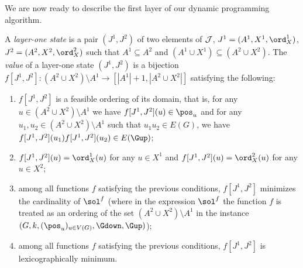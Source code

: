 We are now ready to describe the first layer of our dynamic programming algorithm.
\begin{definition}
A \emph{layer-one state} is a pair $(J^1,J^2)$ of two elements of $\mathcal{J}$,
$J^1 = (A^1,X^1,\ord_X^1)$, $J^2 = (A^2,X^2,\ord_X^2)$ such that 
$A^1 \subseteq A^2$ and $(A^1 \cup X^1) \subseteq (A^2 \cup X^2)$.
The \emph{value} of a layer-one state $(J^1,J^2)$ is a bijection
$f[J^1,J^2] : (A^2 \cup X^2) \setminus A^1 \to [|A^1|+1,|A^2\cup X^2|]$ satisfying the following:
\begin{enumerate}
\item $f[J^1,J^2]$ is a feasible ordering of its domain, that is,
  for any $u \in (A^2 \cup X^2) \setminus A^1$ we have $f[J^1,J^2](u) \in \pos_u$ and
  for any $u_1,u_2 \in (A^2 \cup X^2) \setminus A^1$ such that $u_1u_2\in E(G)$, we have
  $f[J^1,J^2](u_1)f[J^1,J^2](u_2) \in E(\Gup)$;
\item $f[J^1,J^2](u) = \ord_X^1(u)$ for any $u \in X^1$ and
$f[J^1,J^2](u) = \ord_X^2(u)$ for any $u \in X^2$;
  \label{p:layer-one-last}
\item among all functions $f$ satisfying the previous conditions,\label{p:layer-one-min}
  $f[J^1,J^2]$ minimizes the cardinality of $\sol^f$ 
(where in the expression $\sol^f$ the function $f$ is treated as an ordering of the set $(A^2 \cup X^2) \setminus A^1$
 in the \spic{} instance $(G,k,(\pos_u)_{u \in V(G)},\Gdown,\Gup)$);
\item among all functions $f$ satisfying the previous conditions, 
$f[J^1,J^2]$ is lexicographically minimum.
\end{enumerate}
\end{definition}

